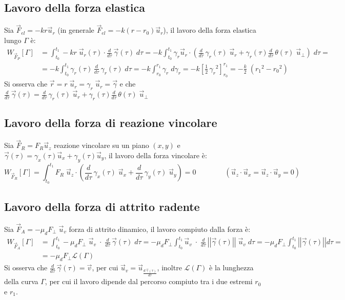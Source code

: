 \documentclass[a4paper]{article}
\newcommand\ux{\vec{u}_x}
\newcommand\uy{\vec{u}_y}
\newcommand\uz{\vec{u}_z}
\newcommand\ur{\vec{u}_r}
\newcommand\uv{\vec{u}_v}
\newcommand\uper{\vec{u}_\perp}
\newcommand\dtau{\frac{d}{d\tau}\,}
\newcommand\vmod[1]{\left|\left|{#1}\right|\right|}
\begin{document}
\subsection{Lavoro della forza elastica}
Sia \(\vec{F}_{el} = - kr \ur\) (in generale \(\vec{F}_{el} = - k (r - r_0) \ur\)), il lavoro della forza elastica lungo \(\Gamma\) è:
\begin{align*}
	W_{\vec{F}_P}[\Gamma] &= \int_{t_0}^{t_1} -kr \; \ur(\tau) \cdot \dtau \vec{\gamma}(\tau) \; d\tau = - k \int_{t_0}^{t_1} \gamma_r \ur \cdot \left( \dtau \gamma_r(\tau) \; \ur + \gamma_r(\tau) \dtau \theta(\tau) \; \uper \right) \; d\tau = \\
	&= -k \int_{t_0}^{t_1} \gamma_r(\tau) \, \dtau \gamma_r(\tau) \; d\tau = -k \int_{r_0}^{r_1} \gamma_r \; d\gamma_r = -k \left[ \frac{1}{2} \, {\gamma_r}^2 \right]_{r_0}^{r_1} = -\frac{k}{2} \; \left( {r_1}^2 - {r_0}^2 \right)
\end{align*}
Si osserva che \(\vec{r} = r \; \ur = \gamma_r \; \ur = \vec{\gamma}\) e che \(\displaystyle \dtau \vec{\gamma}(\tau) = \dtau \gamma_r(\tau) \; \ur + \gamma_r(\tau) \dtau \theta(\tau) \; \uper\)

\newpage

\subsection{Lavoro della forza di reazione vincolare}
Sia \(\vec{F}_R = F_R \uz\) reazione vincolare su un piano \((x,y)\) e \(\vec{\gamma}(\tau) = \gamma_x(\tau) \ux + \gamma_y(\tau) \uy\),
il lavoro della forza vincolare è:
\[W_{\vec{F}_R}[\Gamma] = \int_{t_0}^{t_1} F_R \; \uz \cdot \left( \dtau \gamma_x(\tau) \; \ux + \dtau \gamma_y(\tau) \; \uy \right) = 0 \qquad \qquad (\uz \cdot \ux = \uz \cdot \uy = 0)\]

\subsection{Lavoro della forza di attrito radente}
Sia \(\vec{F}_A = -\mu_d F_\perp \; \uv\) forza di attrito dinamico, il lavoro compiuto dalla forza è:
\begin{align*}
	W_{\vec{F}_A}[\Gamma] &= \int_{t_0}^{t_1} -\mu_d F_\perp \; \uv \; \cdot \; \dtau \vec{\gamma}(\tau) \; d\tau = -\mu_d F_\perp \int_{t_0}^{t_1} \uv \; \cdot \; \dtau \vmod{\vec{\gamma}(\tau)} \; \uv \; d\tau = -\mu_d F_\perp \int_{t_0}^{t_1} \vmod{\vec{\gamma}(\tau)} d\tau = \\
	&= -\mu_d F_\perp \mathcal{L}(\Gamma)
\end{align*}
Si osserva che \(\displaystyle \dtau \vec{\gamma}(\tau) = \vec{v}\), per cui \(\uv = \vec{u}_\frac{d \, \vec{\gamma}(\tau)}{d\tau}\),
inoltre \(\mathcal{L}(\Gamma)\) è la lunghezza della curva \(\Gamma\), per cui il lavoro dipende dal percorso compiuto tra i due
estremi \(r_0\) e \(r_1\).
\end{document}

